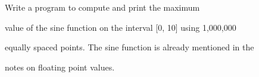Write a program to compute and print the maximum

value of the sine function on the interval [0, 10] using 1,000,000

equally spaced points. The sine function is already mentioned in the

notes on floating point values.


